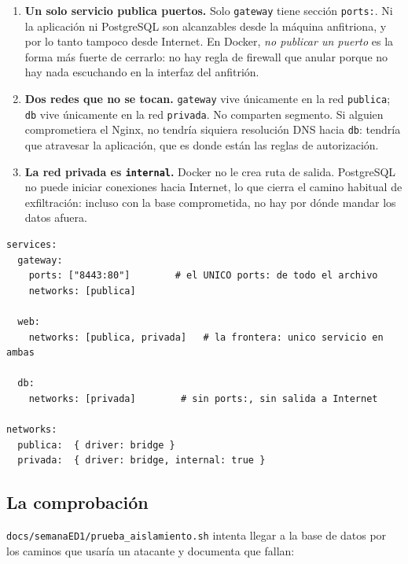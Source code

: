\documentclass[11pt,letterpaper]{article}
\begin{document}
\begin{enumerate}[leftmargin=1.6em,itemsep=5pt]
  \item \textbf{Un solo servicio publica puertos.} Solo \texttt{gateway} tiene
        sección \texttt{ports:}. Ni la aplicación ni PostgreSQL son alcanzables
        desde la máquina anfitriona, y por lo tanto tampoco desde Internet. En
        Docker, \emph{no publicar un puerto} es la forma más fuerte de cerrarlo:
        no hay regla de firewall que anular porque no hay nada escuchando en la
        interfaz del anfitrión.

  \item \textbf{Dos redes que no se tocan.} \texttt{gateway} vive únicamente en
        la red \texttt{publica}; \texttt{db} vive únicamente en la red
        \texttt{privada}. No comparten segmento. Si alguien comprometiera el
        Nginx, no tendría siquiera resolución DNS hacia \texttt{db}: tendría
        que atravesar la aplicación, que es donde están las reglas de
        autorización.

  \item \textbf{La red privada es \texttt{internal}.} Docker no le crea ruta de
        salida. PostgreSQL no puede iniciar conexiones hacia Internet, lo que
        cierra el camino habitual de exfiltración: incluso con la base
        comprometida, no hay por dónde mandar los datos afuera.
\end{enumerate}

\begin{lstlisting}[style=conf,language=yamlqc,caption={Fragmento decisivo de \texttt{docker-compose.segmentado.yml}.}]
services:
  gateway:
    ports: ["8443:80"]        # el UNICO ports: de todo el archivo
    networks: [publica]

  web:
    networks: [publica, privada]   # la frontera: unico servicio en ambas

  db:
    networks: [privada]        # sin ports:, sin salida a Internet

networks:
  publica:  { driver: bridge }
  privada:  { driver: bridge, internal: true }
\end{lstlisting}

\subsection{La comprobación}

\texttt{docs/semanaED1/prueba\_aislamiento.sh} intenta llegar a la base de datos
por los caminos que usaría un atacante y documenta que fallan:
\end{document}

